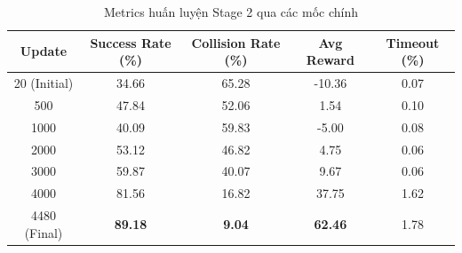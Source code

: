 \begin{table}[H]
\centering
\caption{Metrics huấn luyện Stage 2 qua các mốc chính}
\label{tab:stage2_metrics}
\begin{tabular}{ccccc}
\hline
\textbf{Update} & \textbf{Success Rate (\%)} & \textbf{Collision Rate (\%)} & \textbf{Avg Reward} & \textbf{Timeout (\%)} \\
\hline
20 (Initial) & 34.66 & 65.28 & -10.36 & 0.07 \\
500 & 47.84 & 52.06 & 1.54 & 0.10 \\
1000 & 40.09 & 59.83 & -5.00 & 0.08 \\
2000 & 53.12 & 46.82 & 4.75 & 0.06 \\
3000 & 59.87 & 40.07 & 9.67 & 0.06 \\
4000 & 81.56 & 16.82 & 37.75 & 1.62 \\
4480 (Final) & \textbf{89.18} & \textbf{9.04} & \textbf{62.46} & 1.78 \\
\hline
\end{tabular}
\end{table}

